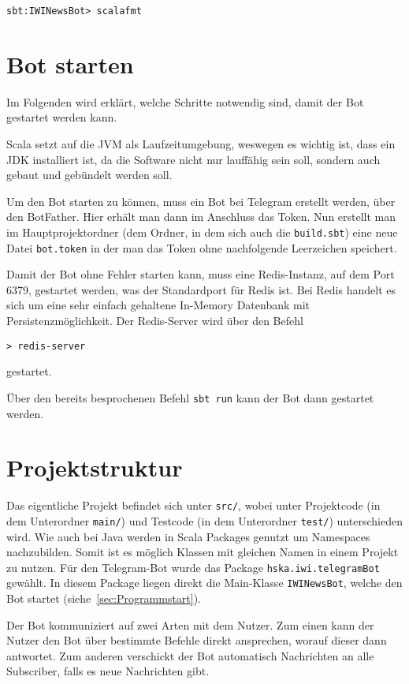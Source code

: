 \begin{lstlisting}
sbt:IWINewsBot> scalafmt
\end{lstlisting}

\section{Bot starten}
Im Folgenden wird erklärt, welche Schritte notwendig sind, damit der Bot gestartet werden kann.

Scala setzt auf die JVM als Laufzeitumgebung, weswegen es wichtig ist, dass ein JDK installiert ist, da die Software nicht nur lauffähig sein soll, sondern auch gebaut und gebündelt werden soll.

Um den Bot starten zu können, muss ein Bot bei Telegram erstellt werden, über den BotFather. Hier erhält man dann im Anschluss das Token. Nun erstellt man im Hauptprojektordner (dem Ordner, in dem sich auch die \texttt{build.sbt}) eine neue Datei \texttt{bot.token} in der man das Token ohne nachfolgende Leerzeichen speichert.

Damit der Bot ohne Fehler starten kann, muss eine Redis-Instanz, auf dem Port 6379, gestartet werden, was der Standardport für Redis ist. Bei Redis handelt es sich um eine sehr einfach gehaltene In-Memory Datenbank mit Persistenzmöglichkeit. Der Redis-Server wird über den Befehl

\begin{lstlisting}
> redis-server
\end{lstlisting}

gestartet.

Über den bereits besprochenen Befehl \texttt{sbt run} kann der Bot dann gestartet werden.

\section{Projektstruktur}
Das eigentliche Projekt befindet sich unter \texttt{src/}, wobei unter Projektcode (in dem Unterordner \texttt{main/}) und Testcode (in dem Unterordner \texttt{test/}) unterschieden wird. Wie auch bei Java werden in Scala Packages genutzt um Namespaces nachzubilden. Somit ist es möglich Klassen mit gleichen Namen in einem Projekt zu nutzen. Für den Telegram-Bot wurde das Package \texttt{hska.iwi.telegramBot} gewählt. In diesem Package liegen direkt die Main-Klasse \texttt{IWINewsBot}, welche den Bot startet (siehe~\autoref{sec:Programmstart}).

Der Bot kommuniziert auf zwei Arten mit dem Nutzer. Zum einen kann der Nutzer den Bot über bestimmte Befehle direkt ansprechen, worauf dieser dann antwortet. Zum anderen verschickt der Bot automatisch Nachrichten an alle Subscriber, falls es neue Nachrichten gibt.


